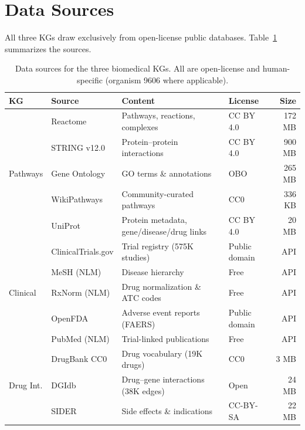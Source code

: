 \documentclass[11pt]{article}
\begin{document}
\section{Data Sources}

All three KGs draw exclusively from open-license public databases. Table~\ref{tab:sources} summarizes the sources.

\begin{table}[H]
\centering
\caption{Data sources for the three biomedical KGs. All are open-license and human-specific (organism 9606 where applicable).}
\label{tab:sources}
\small
\begin{tabular}{llllr}
\toprule
\textbf{KG} & \textbf{Source} & \textbf{Content} & \textbf{License} & \textbf{Size} \\
\midrule
\multirow{5}{*}{Pathways} & Reactome & Pathways, reactions, complexes & CC BY 4.0 & 172 MB \\
& STRING v12.0 & Protein--protein interactions & CC BY 4.0 & 900 MB \\
& Gene Ontology & GO terms \& annotations & OBO & 265 MB \\
& WikiPathways & Community-curated pathways & CC0 & 336 KB \\
& UniProt & Protein metadata, gene/disease/drug links & CC BY 4.0 & 20 MB \\
\midrule
\multirow{5}{*}{Clinical} & ClinicalTrials.gov & Trial registry (575K studies) & Public domain & API \\
& MeSH (NLM) & Disease hierarchy & Free & API \\
& RxNorm (NLM) & Drug normalization \& ATC codes & Free & API \\
& OpenFDA & Adverse event reports (FAERS) & Public domain & API \\
& PubMed (NLM) & Trial-linked publications & Free & API \\
\midrule
\multirow{3}{*}{Drug Int.} & DrugBank CC0 & Drug vocabulary (19K drugs) & CC0 & 3 MB \\
& DGIdb & Drug--gene interactions (38K edges) & Open & 24 MB \\
& SIDER & Side effects \& indications & CC-BY-SA & 22 MB \\
\bottomrule
\end{tabular}
\end{table}

\end{document}
